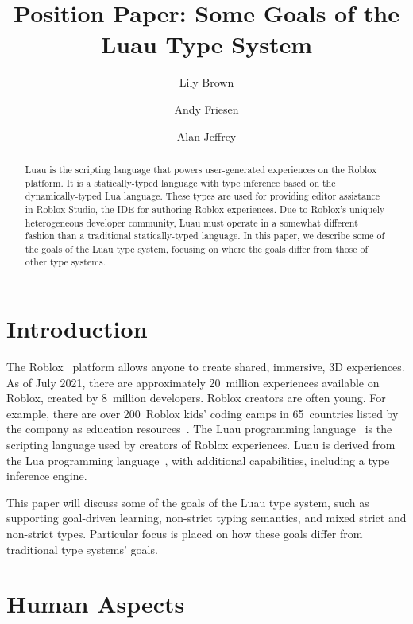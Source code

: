 \documentclass[acmsmall]{acmart}
\begin{document}
\title{Position Paper: Some Goals of the Luau Type System}

\author{Lily Brown}
\author{Andy Friesen}
\author{Alan Jeffrey}

\begin{abstract}
  Luau is the scripting language that powers user-generated experiences on the
  Roblox platform. It is a statically-typed language with type inference based
  on the dynamically-typed Lua language. These types are used for providing
  editor assistance in Roblox Studio, the IDE for authoring Roblox experiences.
  Due to Roblox's uniquely heterogeneous developer community, Luau must operate
  in a somewhat different fashion than a traditional statically-typed language.
  In this paper, we describe some of the goals of the Luau type system,
  focusing on where the goals differ from those of other type systems.
\end{abstract}

\maketitle

\section{Introduction}

The Roblox~\cite{Roblox} platform allows anyone to create shared,
immersive, 3D experiences.  As of July 2021, there are
approximately 20~million experiences available on Roblox, created
by 8~million developers.  Roblox creators are often young. For
example, there are over 200~Roblox kids' coding camps in 65~countries
listed by the company as education resources~\cite{AllEducators}.
The Luau programming language~\cite{Luau} is the scripting language
used by creators of Roblox experiences. Luau is derived from the Lua
programming language~\cite{Lua}, with additional capabilities,
including a type inference engine.

This paper will discuss some of the goals of the Luau type system, such
as supporting goal-driven learning, non-strict typing semantics, and
mixed strict and non-strict types.  Particular focus is placed on how
these goals differ from traditional type systems' goals.

\section{Human Aspects}
\end{document}
